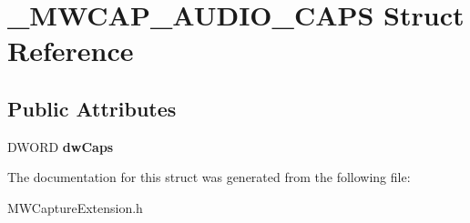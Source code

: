 \hypertarget{struct__MWCAP__AUDIO__CAPS}{\section{\-\_\-\-M\-W\-C\-A\-P\-\_\-\-A\-U\-D\-I\-O\-\_\-\-C\-A\-P\-S Struct Reference}
\label{struct__MWCAP__AUDIO__CAPS}
}
\subsection*{Public Attributes}
\begin{DoxyCompactItemize}
\item 
\hypertarget{struct__MWCAP__AUDIO__CAPS_aaffccb2e17afeae1b3aaf261efbde639}{D\-W\-O\-R\-D {\bfseries dw\-Caps}}\label{struct__MWCAP__AUDIO__CAPS_aaffccb2e17afeae1b3aaf261efbde639}

\end{DoxyCompactItemize}


The documentation for this struct was generated from the following file\-:\begin{DoxyCompactItemize}
\item 
M\-W\-Capture\-Extension.\-h\end{DoxyCompactItemize}
